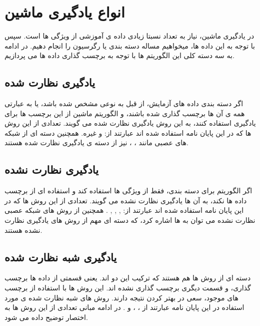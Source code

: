 \section{انواع یادگیری ماشین}

در یادگیری ماشین، نیاز به تعداد نسبتا زیادی داده ی آموزشی از ویژگی ها است. سپس با توجه به این داده ها، میخواهیم مساله دسته بندی یا رگرسیون را انجام دهیم. در ادامه به سه دسته کلی این الگوریتم ها با توجه به برچسب گذاری داده ها می پردازیم.

\subsection{یادگیری نظارت شده}
اگر دسته بندی داده های آزمایش، از قبل به نوعی مشخص شده باشد، یا به عبارتی همه ی آن ها برچسب گذاری شده باشند، و الگوریتم ماشین از این برچسب ها برای یادگیری استفاده کنند، به این روش یادگیری نظارت شده می گویند. تعدادی از این روش ها که در این پایان نامه استفاده شده اند عبارتند از:
و غیره. همچنین دسته ای از شبکه های عصبی مانند
،
،
نیز از دسته ی یادگیری نظارت شده هستند.

\subsection{یادگیری نظارت نشده}
اگر الگوریتم برای دسته بندی، فقط از ویژگی ها استفاده کند و استفاده ای از برچسب داده ها نکند، به آن ها یادگیری نظارت نشده می گویند. تعدادی از این روش ها که در این پایان نامه استفاده شده اند عبارتند از:
,
,
,
.
همچنین از روش های شبکه عصبی نظارت نشده می توان به
ها اشاره کرد، که دسته ای مهم از روش های یادگیری نظارت نشده هستند.

\subsection{یادگیری شبه نظارت شده}
دسته ای از روش ها هم هستند که ترکیب این دو اند. یعنی قسمتی از داده ها برچسب گذاری، ‌و قسمت دیگری برچسب گذاری نشده اند.
این روش ها با استفاده از برچسب های موجود، سعی در بهتر کردن نتیجه دارند. روش های شبه نظارت شده ی مورد استفاده در این پایان نامه عبارتند از
،
،
و
.
در ادامه مبانی تعدادی از این روش ها به اختصار توضیح داده می شود.
